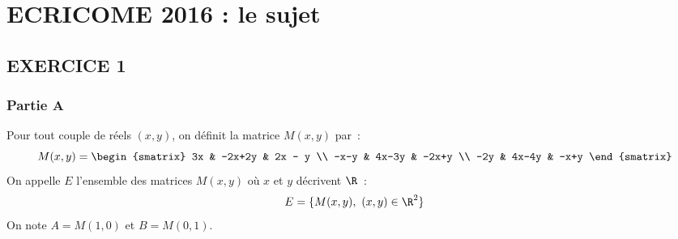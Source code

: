 \chapter*{ECRICOME 2016 : le sujet}
  
%
\vspace*{1cm}

\section*{EXERCICE 1}

\subsection*{Partie A}

\noindent Pour tout couple de réels $(x,y)$, on définit la matrice 
$M(x,y)$ par~:
\[ 
M(x,y) = 
\begin{smatrix} 
3x & -2x+2y & 2x - y \\ 
-x-y & 4x-3y & -2x+y \\
-2y & 4x-4y & -x+y 
\end{smatrix}
\]
On appelle $E$ l'ensemble des matrices $M(x,y)$ où $x$ et $y$ décrivent 
$\R$~:
\[ 
E = \{ M(x,y), \ (x,y) \in \R^2 \} 
\]
On note $A = M(1,0)$ et $B=M(0,1)$.
